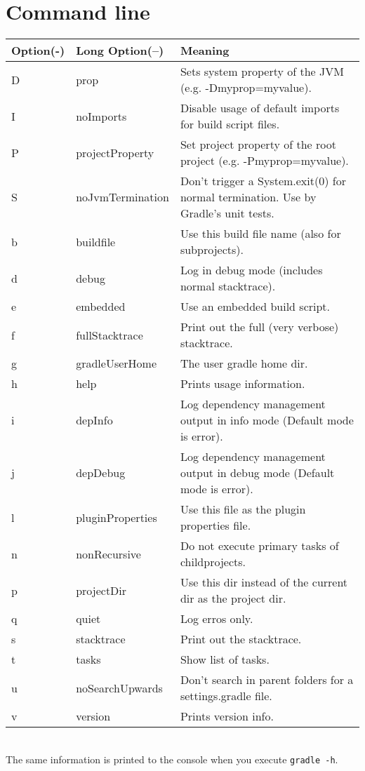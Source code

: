 \chapter{Command line} %
\label{cha:command_line}

\begin{tabular}{l|l|l}
\textbf{Option}(-) & \textbf{Long Option}(--) & \textbf{Meaning}\\ \hline
D & prop             & Sets system property of the JVM (e.g. -Dmyprop=myvalue).\\ 
I & noImports        & Disable usage of default imports for build script files.\\
P & projectProperty  & Set project property of the root project (e.g. -Pmyprop=myvalue).\\
S & noJvmTermination & Don't trigger a System.exit(0) for normal termination. Use by Gradle's unit tests.\\
b & buildfile        & Use this build file name (also for subprojects).\\
d & debug            & Log in debug mode (includes normal stacktrace).\\
e & embedded         & Use an embedded build script.\\
f & fullStacktrace   & Print out the full (very verbose) stacktrace.\\
g & gradleUserHome   & The user gradle home dir.\\
h & help             & Prints usage information.\\
i & depInfo          & Log dependency management output in info mode (Default mode is error).\\
j & depDebug         & Log dependency management output in debug mode (Default mode is error).\\
l & pluginProperties & Use this file as the plugin properties file.\\
n & nonRecursive     & Do not execute primary tasks of childprojects.\\
p & projectDir       & Use this dir instead of the current dir as the project dir.\\
q & quiet            & Log erros only.\\
s & stacktrace       & Print out the stacktrace.\\
t & tasks            & Show list of tasks.\\
u & noSearchUpwards  & Don't search in parent folders for a settings.gradle file.\\
v & version          & Prints version info.\\
\end{tabular}
\\
 
\noindent The same information is printed to the console when you execute \texttt{gradle -h}.\\
